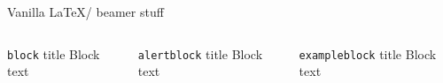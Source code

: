 \begin{frame}[fragile]{Vanilla \LaTeX / beamer stuff}
\begin{columns}
    \begin{column}{0.3\textwidth}
        \begin{block}{\texttt{block} title}
            Block text
        \end{block}
    \end{column}

    \begin{column}{0.3\textwidth}
        \begin{alertblock}{\texttt{alertblock} title}
            Block text
        \end{alertblock}
    \end{column}

    \begin{column}{0.3\textwidth}
        \begin{exampleblock}{\texttt{exampleblock} title}
            Block text
        \end{exampleblock}
    \end{column}
\end{columns}

\begin{columns}
    \begin{column}{0.5\textwidth}
        \begin{tcolorbox}[colframe=orange]
        \end{tcolorbox}
    \end{column}

    \begin{column}{0.5\textwidth}
        \begin{tcolorbox}[colframe=teal]
        \end{tcolorbox}
    \end{column}
\end{columns}
\end{frame}


